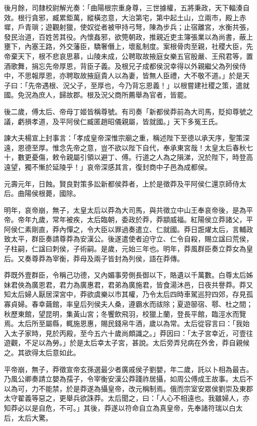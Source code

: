 \begin{pinyinscope}
後月餘，司隸校尉解光奏：「曲陽根宗重身尊，三世據權，五將秉政，天下輻湊自效。根行貪邪，臧累鉅萬，縱橫恣意，大治第宅，第中起土山，立兩市，殿上赤墀，戶青瑣；遊觀射獵，使奴從者被甲持弓弩，陳為步兵；止宿離宮，水衡共張，發民治道，百姓苦其役。內懷姦邪，欲筦朝政，推親近吏主簿張業以為尚書，蔽上壅下，內塞王路，外交藩臣，驕奢僭上，壞亂制度。案根骨肉至親，社稷大臣，先帝棄天下，根不悲哀思慕，山陵未成，公聘取故掖庭女樂五官殷嚴、王飛君等，置酒歌舞，捐忘先帝厚恩，背臣子義。及根兄子成都侯況幸得以外親繼父為列侯侍中，不思報厚恩，亦聘取故掖庭貴人以為妻，皆無人臣禮，大不敬不道。」於是天子曰：「先帝遇根、況父子，至厚也，今乃背忘恩義！」以根嘗建社稷之策，遣就國。免況為庶人，歸故郡。根及況父商所薦舉為官者，皆罷。

後二歲，傅太后、帝母丁姬皆稱尊號。有司奏「新都侯莽前為大司馬，貶抑尊號之議，虧損孝道，及平阿侯仁臧匿趙昭儀親屬，皆就國。」天下多冤王氏。

諫大夫楊宣上封事言：「孝成皇帝深惟宗廟之重，稱述陛下至德以承天序，聖策深遠，恩德至厚。惟念先帝之意，豈不欲以陛下自代，奉承東宮哉！太皇太后春秋七十，數更憂傷，敕令親屬引領以避丁、傅。行道之人為之隕涕，況於陛下，時登高遠望，獨不慚於延陵乎！」哀帝深感其言，復封商中子邑為成都侯。

元壽元年，日蝕。賢良對策多訟新都侯莽者，上於是徵莽及平阿侯仁還京師侍太后。曲陽侯根薨，國除。

明年，哀帝崩，無子，太皇太后以莽為大司馬，與共徵立中山王奉哀帝後，是為平帝。帝年九歲，常年被疾，太后臨朝，委政於莽，莽顓威福。紅陽侯立莽諸父，平阿侯仁素剛直，莽內憚之，令大臣以罪過奏遣立、仁就國。莽日誑燿太后，言輔政致太平，群臣奏請尊莽為安漢公。後遂遣使者迫守立、仁令自殺，賜立諡曰荒侯，子柱嗣，仁諡曰刺侯，子術嗣。是歲，元始三年也。明年，莽風群臣奏立莽女為皇后。又奏尊莽為宰衡，莽母及兩子皆封為列侯，語在莽傳。

莽既外壹群臣，令稱己功德，又內媚事旁側長御以下，賂遺以千萬數。白尊太后姊妹君俠為廣恩君，君力為廣惠君，君弟為廣施君，皆食湯沐邑，日夜共譽莽。莽又知太后婦人厭居深宮中，莽欲虞樂以市其權，乃令太后四時車駕巡狩四郊，存見孤寡貞婦。春幸繭館，率皇后列侯夫人桑，遵霸水而祓除；夏遊篽宿、鄠、杜之間；秋歷東館，望昆明，集黃山宮；冬饗飲飛羽，校獵上蘭，登長平館，臨涇水而覽焉。太后所至屬縣，輒施恩惠，賜民錢帛牛酒，歲以為常。太后從容言曰：「我始入太子家時，見於丙殿，至今五六十歲尚頗識之。」莽因曰：「太子宮幸近，可壹往遊觀，不足以為勞。」於是太后幸太子宮，甚說。太后旁弄兒病在外舍，莽自親候之。其欲得太后意如此。

平帝崩，無子，莽徵宣帝玄孫選最少者廣戚侯子劉嬰，年二歲，託以卜相為最吉。乃風公卿奏請立嬰為孺子，令宰衡安漢公莽踐祚居攝，如周公傅成王故事。太后不以為可，力不能禁，於是莽遂為攝皇帝，改元稱制焉。俄而宗室安眾侯劉崇及東郡太守翟義等惡之，更舉兵欲誅莽。太后聞之，曰：「人心不相遠也。我雖婦人，亦知莽必以是自危，不可。」其後，莽遂以符命自立為真皇帝，先奉諸符瑞以白太后，太后大驚。


\end{pinyinscope}

